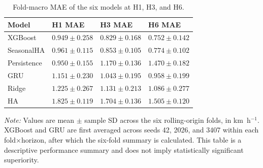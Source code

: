 \documentclass[pdflatex,sn-mathphys-num,iicol]{sn-jnl}
\begin{document}

\begin{table}[!t]
\caption{Fold-macro MAE of the six models at H1, H3, and H6.}
\label{tab:fold-macro-mae}
\centering

\renewcommand{\arraystretch}{1.15}

\begin{tabular}{
|p{}
|p{}
|p{}
|p{}|
}
\hline

\textbf{Model}
&
\textbf{H1 MAE}
&
\textbf{H3 MAE}
&
\textbf{H6 MAE}
\\
\hline

XGBoost
&
$0.949 \pm 0.258$
&
$0.829 \pm 0.168$
&
$0.752 \pm 0.142$
\\
\hline

SeasonalHA
&
$0.961 \pm 0.115$
&
$0.853 \pm 0.105$
&
$0.774 \pm 0.102$
\\
\hline

Persistence
&
$0.950 \pm 0.155$
&
$1.170 \pm 0.136$
&
$1.470 \pm 0.182$
\\
\hline

GRU
&
$1.151 \pm 0.230$
&
$1.043 \pm 0.195$
&
$0.958 \pm 0.199$
\\
\hline

Ridge
&
$1.225 \pm 0.267$
&
$1.131 \pm 0.213$
&
$1.086 \pm 0.277$
\\
\hline

HA
&
$1.825 \pm 0.119$
&
$1.704 \pm 0.136$
&
$1.505 \pm 0.120$
\\
\hline

\end{tabular}

\vspace{2mm}

\begin{flushleft}
\footnotesize
\textit{Note:} Values are mean $\pm$ sample SD across the six rolling-origin folds, in km~h$^{-1}$. XGBoost and GRU are first averaged across seeds 42, 2026, and 3407 within each fold$\times$horizon, after which the six-fold summary is calculated. This table is a descriptive performance summary and does not imply statistically significant superiority.
\end{flushleft}

\end{table}


\end{document}
